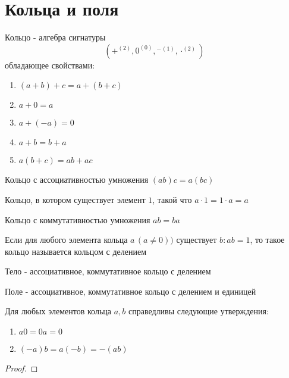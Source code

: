 \documentclass[../main/document.tex]{subfiles}
\begin{document}
\section{Кольца и поля}
\begin{dfn}[Кольцо]
Кольцо - алгебра сигнатуры
$$(+^{(2)},0^{(0)},{{}^{-}}^{(1)},\cdot^{(2)})$$
обладающее свойствами:
\begin{enumerate}
\item $(a+b)+c=a+(b+c)$
\item $a+0=a$
\item $a+(-a)=0$
\item $a+b=b+a$
\item $a(b+c)=ab+ac$
\end{enumerate}
\end{dfn}
\begin{dfn}
Кольцо с ассоциативностью умножения $(ab)c=a(bc)$
\end{dfn}
\begin{dfn}
Кольцо, в котором существует элемент $1$, такой что $a\cdot 1=1\cdot a=a$
\end{dfn}
\begin{dfn}
Кольцо с коммутативностью умножения $ab=ba$
\end{dfn}
\begin{dfn}
Если для любого элемента кольца $a\,(a\neq 0))$ существует $b:ab=1$, то такое кольцо называется кольцом с делением
\end{dfn}
\begin{dfn}[Тело]
Тело - ассоциативное, коммутативное кольцо с делением
\end{dfn}
\begin{dfn}[Поле]
Поле - ассоциативное, коммутативное кольцо с делением и единицей
\end{dfn}
\begin{exm}

\end{exm}
\begin{thm}
Для любых элементов кольца $a,b$ справедливы следующие утверждения:
\begin{enumerate}
\item $a0=0a=0$
\item $(-a)b=a(-b)=-(ab)$
\end{enumerate}
\begin{proof}

\end{proof}
\end{thm}
\end{document}
